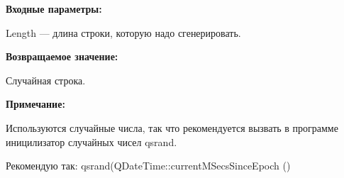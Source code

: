 \textbf{Входные параметры:}

Length --- длина строки, которую надо сгенерировать.

\textbf{Возвращаемое значение:}

Случайная строка.

\textbf{Примечание:}

Используются случайные числа, так что рекомендуется вызвать в программе иницилизатор случайных чисел qsrand.

Рекомендую так: qsrand(QDateTime::currentMSecsSinceEpoch () %
